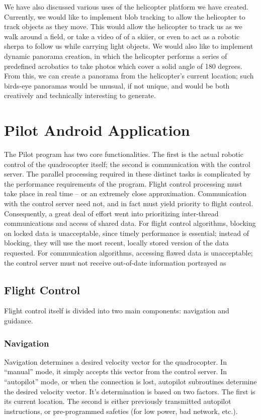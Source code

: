 We have also discussed various uses of the helicopter platform we have
created. Currently, we would like to implement blob tracking to allow
the helicopter to track objects as they move. This would allow the
helicopter to track us as we walk around a field, or take a video of
of a skiier, or even to act as a robotic sherpa to follow us while
carrying light objects. We would also like to implement dynamic
panorama creation, in which the helicopter performs a series of
predefined acrobatics to take photos which cover a solid angle of 180
degrees. From this, we can create a panorama from the helicopter's
current location; such birds-eye panoramas would be unusual, if not
unique, and would be both creatively and technically interesting to
generate.

\section{Pilot Android Application}
\label{sec:pilot}
The Pilot program has two core functionalities.‭ ‬The first is the
actual robotic control of the quadrocopter itself‭; ‬the second is
communication with the control server.‭ ‬The parallel processing
required in these distinct tasks is complicated by the performance
requirements of the program.‭ ‬Flight control processing must take place
in real time -- or an extremely close approximation.‭ ‬Communication with
the control server need not,‭ ‬and in fact must yield priority to flight
control.‭ ‬Consequently,‭ ‬a great deal of effort went into prioritizing
inter-thread communications and access of shared data.‭ ‬For flight
control algorithms,‭ ‬blocking on locked data is unacceptable,‭ ‬since
timely performance is essential‭; ‬instead of blocking,‭ ‬they will use
the most recent,‭ ‬locally stored version of the data requested.‭ ‬For
communication algorithms,‭ ‬accessing flawed data is unacceptable‭; ‬the
control server must not receive out-of-date information portrayed as

\subsection{Flight Control}
Flight control itself is divided into two main components:‭ ‬navigation and guidance.
	
\subsubsection{Navigation}
Navigation determines a desired velocity vector for the quadrocopter.‭
‬In‭ “‬manual‭” ‬mode,‭ ‬it simply accepts this vector from the control
server.‭ ‬In‭ “‬autopilot‭” ‬mode,‭ ‬or when the connection is lost,‭ ‬autopilot
subroutines determine the desired velocity vector.‭ ‬It's determination
is based on two factors.‭ ‬The first is its current location.‭ ‬The second
is either previously transmitted autopilot instructions,‭ ‬or
pre-programmed safeties‭ (‬for low power,‭ ‬bad network,‭ ‬etc.‭).

